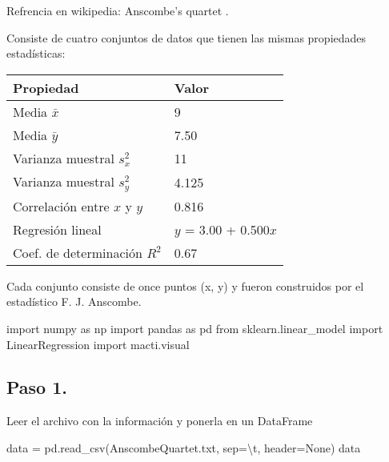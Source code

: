 \documentclass[
  letterpaper,
  DIV=11,
  numbers=noendperiod]{scrreprt}
\newenvironment{Shaded}{\begin{snugshade}}{\end{snugshade}}
\newcommand{\CharTok}[1]{\textcolor[rgb]{0.13,0.47,0.30}{#1}}
\newcommand{\ImportTok}[1]{\textcolor[rgb]{0.00,0.46,0.62}{#1}}
\newcommand{\NormalTok}[1]{\textcolor[rgb]{0.00,0.23,0.31}{#1}}
\newcommand{\OperatorTok}[1]{\textcolor[rgb]{0.37,0.37,0.37}{#1}}
\newcommand{\StringTok}[1]{\textcolor[rgb]{0.13,0.47,0.30}{#1}}
\newcommand{\VariableTok}[1]{\textcolor[rgb]{0.07,0.07,0.07}{#1}}
\begin{document}
Refrencia en wikipedia: Anscombe's quartet .

Consiste de cuatro conjuntos de datos que tienen las mismas propiedades
estadísticas:

\begin{longtable}[]{@{}ll@{}}
\toprule\noalign{}
Propiedad & Valor \\
\midrule\noalign{}
\endhead
\bottomrule\noalign{}
\endlastfoot
Media \(\bar{x}\) & 9 \\
Media \(\bar{y}\) & 7.50 \\
Varianza muestral \(s_x^2\) & 11 \\
Varianza muestral \(s_y^2\) & 4.125 \\
Correlación entre \(x\) y \(y\) & 0.816 \\
Regresión lineal & \(y\) = 3.00 + 0.500\(x\) \\
Coef. de determinación \(R^{2}\) & 0.67 \\
\end{longtable}

Cada conjunto consiste de once puntos (x, y) y fueron construidos por el
estadístico F. J. Anscombe.

\begin{Shaded}
\begin{Highlighting}[]
\ImportTok{import}\NormalTok{ numpy }\ImportTok{as}\NormalTok{ np}
\ImportTok{import}\NormalTok{ pandas }\ImportTok{as}\NormalTok{ pd }
\ImportTok{from}\NormalTok{ sklearn.linear\_model }\ImportTok{import}\NormalTok{ LinearRegression}
\ImportTok{import}\NormalTok{ macti.visual}
\end{Highlighting}
\end{Shaded}

\subsection{Paso 1.}\label{paso-1.}

Leer el archivo con la información y ponerla en un DataFrame

\begin{Shaded}
\begin{Highlighting}[]
\NormalTok{data }\OperatorTok{=}\NormalTok{ pd.read\_csv(}\StringTok{\textquotesingle{}AnscombeQuartet.txt\textquotesingle{}}\NormalTok{, sep}\OperatorTok{=}\StringTok{\textquotesingle{}}\CharTok{\textbackslash{}t}\StringTok{\textquotesingle{}}\NormalTok{, header}\OperatorTok{=}\VariableTok{None}\NormalTok{)}
\NormalTok{data}
\end{Highlighting}
\end{Shaded}
\end{document}
